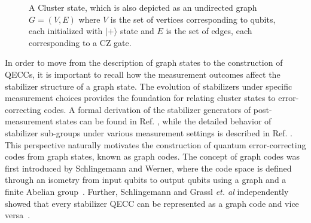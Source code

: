 \documentclass[reprint, amsmath,amssymb, aps,pra,
 floatfix,
]{revtex4-2}
\begin{document}
\begin{figure}[htbp]
    \centering
 \caption{A Cluster state, which is also depicted as an undirected graph $G=(V,E)$ where $V$ is the set of vertices corresponding to qubits, each initialized with $|{+}\rangle$ state and $E$ is the set of edges, each corresponding to a $\mathrm{CZ}$ gate.}   
 \label{fig: 2D cluster state}
\end{figure}

\noindent In order to move from the description of graph states to the construction of QECCs, it is important to recall how the measurement outcomes affect the stabilizer structure of a graph state.
The evolution of stabilizers under specific measurement choices provides the foundation for relating cluster states to error-correcting codes.
A formal derivation of the stabilizer generators of post-measurement states can be found in Ref. \cite{nielsen2010quantum}, while the detailed behavior of stabilizer sub-groups under various measurement settings is described in Ref. \cite{patil2023clifford,PhysRevA.69.062311}.
This perspective naturally motivates the construction of quantum error-correcting codes from graph states, known as graph codes.
The concept of graph codes was first introduced by Schlingemann and Werner, where the code space is defined through an isometry from input qubits to output qubits using a graph and a finite Abelian group~\cite{Schlingemann_2001,10.1007/978-3-642-20901-7_9}. 
Further, Schlingemann and Grassl \emph{et. al} independently showed that every stabilizer QECC can be represented as a graph code and vice versa~\cite{1023317,https://doi.org/10.48550/arxiv.quant-ph/0111080}. 
\end{document}
